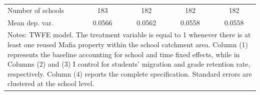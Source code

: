 \documentclass[12pt]{article}
\theoremstyle{plain}
\theoremstyle{plain}
\theoremstyle{plain}
\theoremstyle{definition}
\theoremstyle{plain}
\theoremstyle{definition}
\theoremstyle{plain}
\theoremstyle{remark}
\theoremstyle{definition}
\theoremstyle{definition}
\theoremstyle{plain}
\begin{document}
\begin{table}[H]
{\begin{tabular}{p{8.11em}llll}
			\multicolumn{1}{l}{Number of schools} & \multicolumn{1}{c}{183} & \multicolumn{1}{c}{182} & \multicolumn{1}{c}{182} & \multicolumn{1}{c}{182} \\
			\multicolumn{1}{l}{Mean dep. var.} & \multicolumn{1}{c}{0.0566} & \multicolumn{1}{c}{0.0562} & \multicolumn{1}{c}{0.0558} & \multicolumn{1}{c}{0.0558} \\
			\midrule
			\multicolumn{5}{p{28.11em}}{Notes: TWFE model. The treatment variable is equal to 1 whenever there is at least one reused Mafia property within the school catchment area. Column (1) represents the baseline accounting for school and time fixed effects, while in Columns (2) and (3) I control for students' migration and grade retention rate, respectively. Column (4) reports the complete specification. Standard errors are clustered at the school level.} \\
		\end{tabular}%
	}
\end{table}
\end{document}
